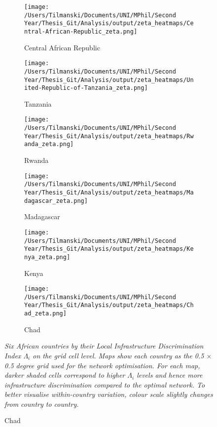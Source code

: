 \documentclass[11pt, oneside]{article}   	%
\newcommand{\mysubcaption}[1]{
\justify
\begin{spacing}{0.7}
\textit{\footnotesize #1}
\end{spacing}}
\begin{document}
\begin{figure}[t]
\centering
\caption{Spatial Distribution of $\Lambda_{i}$ for sample countries}

\begin{subfigure}[c]{0.32\textwidth}
\texttt{[image: /Users/Tilmanski/Documents/UNI/MPhil/Second Year/Thesis\_Git/Analysis/output/zeta\_heatmaps/Central-African-Republic\_zeta.png]}
\caption{Central African Republic}
\label{fig:Central African Republic_zeta}
\end{subfigure}
\begin{subfigure}[c]{0.32\textwidth}
\texttt{[image: /Users/Tilmanski/Documents/UNI/MPhil/Second Year/Thesis\_Git/Analysis/output/zeta\_heatmaps/United-Republic-of-Tanzania\_zeta.png]}
\caption{Tanzania}
\label{fig:Tanzania_zeta}
\end{subfigure}
\begin{subfigure}[c]{0.32\textwidth}
\texttt{[image: /Users/Tilmanski/Documents/UNI/MPhil/Second Year/Thesis\_Git/Analysis/output/zeta\_heatmaps/Rwanda\_zeta.png]}
\caption{Rwanda}
\label{fig:Rwanda_zeta}
\end{subfigure}

\begin{subfigure}[c]{0.32\textwidth}
\texttt{[image: /Users/Tilmanski/Documents/UNI/MPhil/Second Year/Thesis\_Git/Analysis/output/zeta\_heatmaps/Madagascar\_zeta.png]}
\caption{Madagascar}
\label{fig:Madagascar_zeta}
\end{subfigure}
\begin{subfigure}[c]{0.32\textwidth}
\texttt{[image: /Users/Tilmanski/Documents/UNI/MPhil/Second Year/Thesis\_Git/Analysis/output/zeta\_heatmaps/Kenya\_zeta.png]}
\caption{Kenya}
\label{fig:Kenya_zeta}
\end{subfigure}
\begin{subfigure}[c]{0.32\textwidth}
\texttt{[image: /Users/Tilmanski/Documents/UNI/MPhil/Second Year/Thesis\_Git/Analysis/output/zeta\_heatmaps/Chad\_zeta.png]}
\caption{Chad}
\label{fig:Chad_zeta}
\end{subfigure}



\label{fig:zeta_countries}
\mysubcaption{Six African countries by their Local Infrastructure Discrimination Index $\Lambda_{i}$ on the grid cell level. Maps show each country as the 0.5 $\times$ 0.5 degree grid used for the network optimisation. For each map, darker shaded cells correspond to higher $\Lambda_{i}$ levels and hence more infrastructure discrimination compared to the optimal network. To better visualise within-country variation, colour scale slightly changes from country to country.}
\end{figure}
\end{document}
